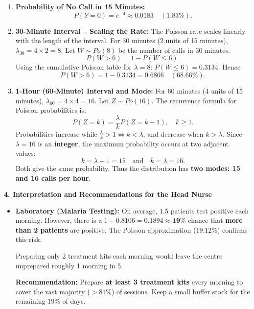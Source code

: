 \documentclass[11pt]{article}
\newcommand{\cle}[1]{{\popxbold\color{popdark}#1}}
\begin{document}
\begin{exoresolu}
\begin{enumerate}
\item \textbf{Probability of No Call in 15 Minutes:}
      \[
      P(Y = 0) = e^{-4} \approx \mathbf{0.0183} \quad (1.83\%).
      \]

\item \textbf{30-Minute Interval -- Scaling the Rate:}  
      The Poisson rate scales linearly with the length of the interval. For 30 minutes (2 units of 15 minutes), $\lambda_{30} = 4 \times 2 = 8$.  
      Let $W \sim Po(8)$ be the number of calls in 30 minutes.
      \[
      P(W > 6) = 1 - P(W \le 6).
      \]
      Using the cumulative Poisson table for $\lambda = 8$:
      $P(W \le 6) = 0.3134$. Hence
      \[
      P(W > 6) = 1 - 0.3134 = \mathbf{0.6866} \quad (68.66\%).
      \]

\item \textbf{1-Hour (60-Minute) Interval and Mode:}  
      For 60 minutes (4 units of 15 minutes), $\lambda_{60} = 4 \times 4 = 16$. Let $Z \sim Po(16)$.  
      The \cle{recurrence formula} for Poisson probabilities is:
      \[
      P(Z = k) = \frac{\lambda}{k} P(Z = k-1), \quad k \ge 1.
      \]
      Probabilities increase while $\frac{\lambda}{k} > 1 \iff k < \lambda$, and decrease when $k > \lambda$.  
      Since $\lambda = 16$ is an \textbf{integer}, the maximum probability occurs at two adjacent values:
      \[
      k = \lambda - 1 = 15 \quad \text{and} \quad k = \lambda = 16.
      \]
      Both give the same probability. Thus the distribution has \textbf{two modes: 15 and 16 calls per hour}.
\end{enumerate}

\textbf{4. Interpretation and Recommendations for the Head Nurse}

\begin{itemize}
\item \textbf{Laboratory (Malaria Testing):} On average, $1.5$ patients test positive each morning. However, there is a $1 - 0.8106 = 0.1894 \approx \mathbf{19\%}$ chance that \textbf{more than 2 patients} are positive. The Poisson approximation ($19.12\%$) confirms this risk.
      \begin{attention}
      Preparing only 2 treatment kits each morning would leave the centre unprepared roughly 1 morning in 5.
      \end{attention}
      \textbf{Recommendation:} Prepare \textbf{at least 3 treatment kits} every morning to cover the vast majority ($>81\%$) of sessions. Keep a small buffer stock for the remaining $19\%$ of days.


\end{itemize}
\end{exoresolu}
\end{document}
